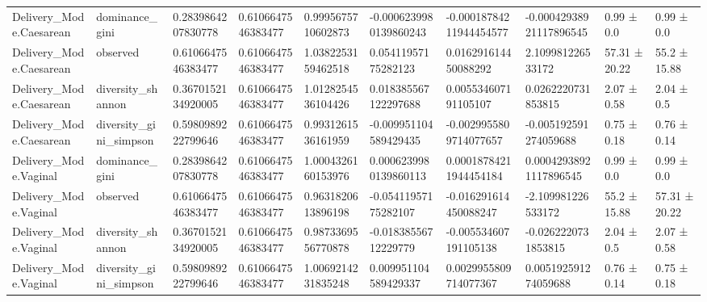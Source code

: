 \begin{longtable}{llllllllll}
Delivery\_Mode.Caesarean & dominance\_gini & 0.2839864207830778 & 0.6106647546383477 & 0.9995675710602873 & -0.0006239980139860243 & -0.00018784211944454577 & -0.00042938921117896545 & 0.99 ± 0.0 & 0.99 ± 0.0 \\
Delivery\_Mode.Caesarean & observed & 0.6106647546383477 & 0.6106647546383477 & 1.0382253159462518 & 0.05411957175282123 & 0.016291614450088292 & 2.109981226533172 & 57.31 ± 20.22 & 55.2 ± 15.88 \\
Delivery\_Mode.Caesarean & diversity\_shannon & 0.3670152134920005 & 0.6106647546383477 & 1.0128254536104426 & 0.018385567122297688 & 0.005534607191105107 & 0.0262220731853815 & 2.07 ± 0.58 & 2.04 ± 0.5 \\
Delivery\_Mode.Caesarean & diversity\_gini\_simpson & 0.5980989222799646 & 0.6106647546383477 & 0.9931261536161959 & -0.009951104589429435 & -0.0029955809714077657 & -0.005192591274059688 & 0.75 ± 0.18 & 0.76 ± 0.14 \\
Delivery\_Mode.Vaginal & dominance\_gini & 0.2839864207830778 & 0.6106647546383477 & 1.0004326160153976 & 0.0006239980139860113 & 0.00018784211944454184 & 0.00042938921117896545 & 0.99 ± 0.0 & 0.99 ± 0.0 \\
Delivery\_Mode.Vaginal & observed & 0.6106647546383477 & 0.6106647546383477 & 0.9631820613896198 & -0.05411957175282107 & -0.016291614450088247 & -2.109981226533172 & 55.2 ± 15.88 & 57.31 ± 20.22 \\
Delivery\_Mode.Vaginal & diversity\_shannon & 0.3670152134920005 & 0.6106647546383477 & 0.9873369556770878 & -0.01838556712229779 & -0.005534607191105138 & -0.0262220731853815 & 2.04 ± 0.5 & 2.07 ± 0.58 \\
Delivery\_Mode.Vaginal & diversity\_gini\_simpson & 0.5980989222799646 & 0.6106647546383477 & 1.0069214231835248 & 0.009951104589429337 & 0.0029955809714077367 & 0.005192591274059688 & 0.76 ± 0.14 & 0.75 ± 0.18 \\
\end{longtable}
